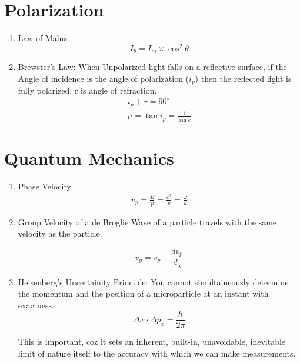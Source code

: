 \documentclass[12pt]{article}
\begin{document}
\section{Polarization}
\begin{enumerate}
	\item Law of Malus
	\begin{equation}
		I_\theta = I_m \times \cos^2\theta
	\end{equation}

	\item Brewster's Law: When Unpolarized light falls on a reflective surface, if the Angle of incidence is the angle of polarization ($i_p$) then the reflected light is fully polarized. r is angle of refraction.
	\begin{eqnarray}
		i_p + r = 90^\circ\\
		\mu = \tan i_p = \frac{1}{\sin c}
	\end{eqnarray}
\end{enumerate}


\section{Quantum Mechanics}
\begin{enumerate}
	\item Phase Velocity
	\begin{eqnarray}
		v_p = \frac{E}{p} = \frac{c^2}{v} = \frac{\omega}{k}
	\end{eqnarray}
	
	\item Group Velocity of a de Broglie Wave of a particle travels with the same velocity as the particle.
	
	\begin{equation}
		v_g = v_p - \frac{dv_p}{d_\lambda}
	\end{equation}
	
	\item Heisenberg's Uncertainity Principle: 
	You cannot simultaineously determine the momentum and the position of a microparticle at an instant with exactness. 
	\begin{equation}
		\Delta x \cdot \Delta p_x = \frac{h}{2\pi}
	\end{equation}

	This is important, coz it sets an inherent, built-in, unavoidable, inevitable limit of nature itself to the accuracy with which we can make measurements.
\end{enumerate}
\end{document}
